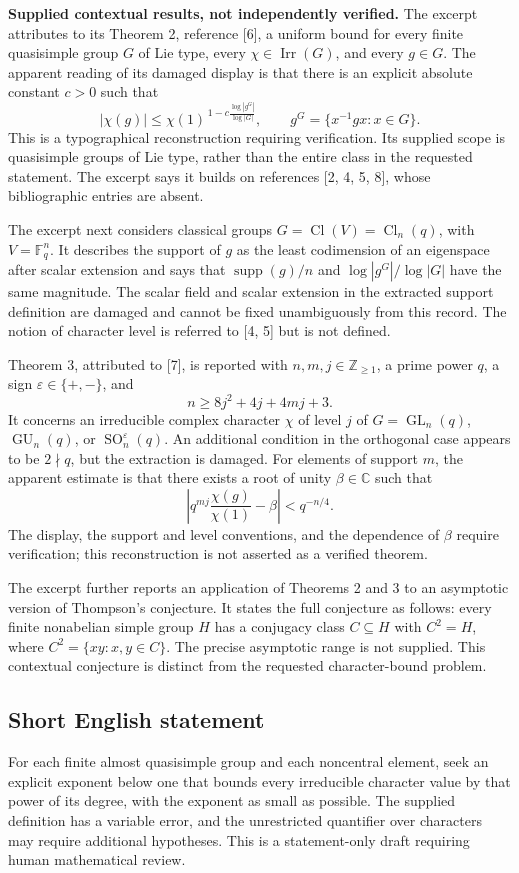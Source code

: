 \documentclass[11pt]{article}
\begin{document}
\textbf{Supplied contextual results, not independently verified.} The excerpt attributes to its Theorem 2, reference [6], a uniform bound for every finite quasisimple group \(G\) of Lie type, every \(\chi\in\operatorname{Irr}(G)\), and every \(g\in G\). The apparent reading of its damaged display is that there is an explicit absolute constant \(c>0\) such that
\[
|\chi(g)|\leq\chi(1)^{\,1-c\frac{\log|g^G|}{\log|G|}},
\qquad
g^G=\{x^{-1}gx:x\in G\}.
\]
This is a typographical reconstruction requiring verification. Its supplied scope is quasisimple groups of Lie type, rather than the entire class in the requested statement. The excerpt says it builds on references [2, 4, 5, 8], whose bibliographic entries are absent.

The excerpt next considers classical groups \(G=\operatorname{Cl}(V)=\operatorname{Cl}_n(q)\), with \(V=\mathbb F_q^n\). It describes the support of \(g\) as the least codimension of an eigenspace after scalar extension and says that \(\operatorname{supp}(g)/n\) and \(\log|g^G|/\log|G|\) have the same magnitude. The scalar field and scalar extension in the extracted support definition are damaged and cannot be fixed unambiguously from this record. The notion of character level is referred to [4, 5] but is not defined.

Theorem 3, attributed to [7], is reported with \(n,m,j\in\mathbb Z_{\geq1}\), a prime power \(q\), a sign \(\varepsilon\in\{+,-\}\), and
\[
n\geq8j^2+4j+4mj+3.
\]
It concerns an irreducible complex character \(\chi\) of level \(j\) of \(G=\operatorname{GL}_n(q)\), \(\operatorname{GU}_n(q)\), or \(\operatorname{SO}^{\varepsilon}_n(q)\). An additional condition in the orthogonal case appears to be \(2\nmid q\), but the extraction is damaged. For elements of support \(m\), the apparent estimate is that there exists a root of unity \(\beta\in\mathbb C\) such that
\[
\left|q^{mj}\frac{\chi(g)}{\chi(1)}-\beta\right|<q^{-n/4}.
\]
The display, the support and level conventions, and the dependence of \(\beta\) require verification; this reconstruction is not asserted as a verified theorem.

The excerpt further reports an application of Theorems 2 and 3 to an asymptotic version of Thompson's conjecture. It states the full conjecture as follows: every finite nonabelian simple group \(H\) has a conjugacy class \(C\subseteq H\) with \(C^2=H\), where \(C^2=\{xy:x,y\in C\}\). The precise asymptotic range is not supplied. This contextual conjecture is distinct from the requested character-bound problem.
\subsection{Short English statement}
For each finite almost quasisimple group and each noncentral element, seek an explicit exponent below one that bounds every irreducible character value by that power of its degree, with the exponent as small as possible. The supplied definition has a variable error, and the unrestricted quantifier over characters may require additional hypotheses. This is a statement-only draft requiring human mathematical review.
\end{document}
